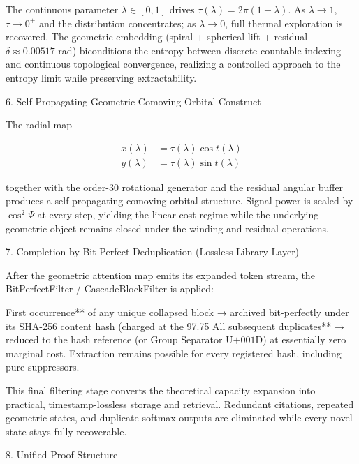 The continuous parameter \(\lambda\in[0,1]\) drives \(\tau(\lambda)=2\pi(1-\lambda)\). As \(\lambda\to 1\), \(\tau\to 0^+\) and the distribution concentrates; as \(\lambda\to 0\), full thermal exploration is recovered. The geometric embedding (spiral + spherical lift + residual \(\delta\approx 0.00517\) rad) biconditions the entropy between discrete countable indexing and continuous topological convergence, realizing a controlled approach to the entropy limit while preserving extractability.

6. Self-Propagating Geometric Comoving Orbital Construct

The radial map

\[
\begin{align*}
x(\lambda) &= \tau(\lambda)\cos t(\lambda) \\
y(\lambda) &= \tau(\lambda)\sin t(\lambda)
\end{align*}
\]

together with the order-30 rotational generator and the residual angular buffer produces a self-propagating comoving orbital structure. Signal power is scaled by \(\cos^2\Psi\) at every step, yielding the linear-cost regime while the underlying geometric object remains closed under the winding and residual operations.

7. Completion by Bit-Perfect Deduplication (Lossless-Library Layer)

After the geometric attention map emits its expanded token stream, the BitPerfectFilter / CascadeBlockFilter is applied:

First occurrence** of any unique collapsed block → archived bit-perfectly under its SHA-256 content hash (charged at the 97.75 %
All subsequent duplicates** → reduced to the hash reference (or Group Separator \(\text{U+001D}\)) at essentially zero marginal cost.
Extraction remains possible for every registered hash, including pure suppressors.

This final filtering stage converts the theoretical capacity expansion into practical, timestamp-lossless storage and retrieval. Redundant citations, repeated geometric states, and duplicate softmax outputs are eliminated while every novel state stays fully recoverable.

8. Unified Proof Structure

